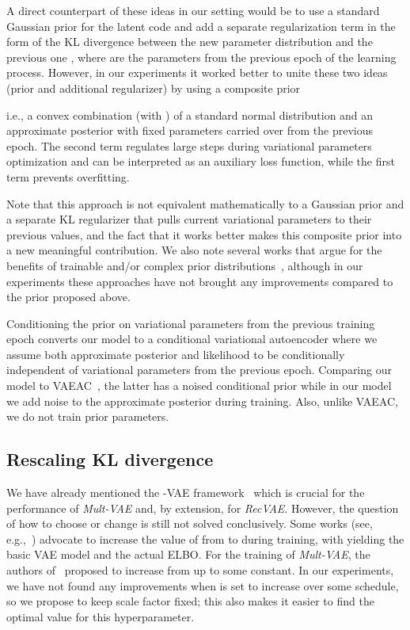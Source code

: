 \documentclass[sigconf,authorversion]{acmart}
\begin{document}
A direct counterpart of these ideas in our setting would be to use a standard Gaussian prior for the latent code  and add a separate regularization term in the form of the KL divergence between the new parameter distribution  and the previous one , where  are the parameters from the previous epoch of the learning process. However, in our experiments it worked better to unite these two ideas (prior and additional regularizer) by using a composite prior

i.e., a convex combination (with ) of a standard normal distribution and an approximate posterior  with fixed parameters carried over from the previous epoch. The second term regulates large steps during variational parameters optimization and can be interpreted as an auxiliary loss function, while the first term prevents overfitting.

Note that this approach is not equivalent mathematically to a Gaussian prior and a separate KL regularizer that pulls current variational parameters to their previous values, and the fact that it works better makes this composite prior into a new meaningful contribution. We also note several works that argue for the benefits of trainable and/or complex prior distributions~\cite{tomczak2018vae,xu2019necessity}, although in our experiments these approaches have not brought any improvements compared to the prior proposed above.

Conditioning the prior on variational parameters from the previous training epoch converts our model to a conditional variational autoencoder where we assume both approximate posterior and likelihood to be conditionally independent of variational parameters from the previous epoch. Comparing our model to VAEAC~\cite{DBLP:conf/iclr/IvanovFV19}, the latter has a noised conditional prior while in our model we add noise to the approximate posterior during training. Also, unlike VAEAC, we do not train prior parameters.

\subsection{Rescaling KL divergence}\label{sec:kl}

We have already mentioned the -VAE framework~\cite{Higgins2017betaVAELB} which is crucial for the performance of \emph{Mult-VAE} and, by extension, for \emph{RecVAE}. However, the question of how to choose or change  is still not solved conclusively. Some works (see, e.g.,~\cite{bowman2016generating}) advocate to increase the value of  from  to  during training, with  yielding the basic VAE model and the actual ELBO. For the training of \emph{Mult-VAE}, the authors of~\cite{liang2018variational} proposed to increase  from  up to some constant. In our experiments, we have not found any improvements when  is set to increase over some schedule, so we propose to keep scale factor fixed; this also makes it easier to find the optimal value for this hyperparameter.
\end{document}
